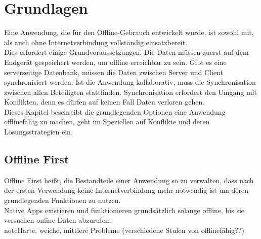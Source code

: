 \chapter{\label{chap:grundlagen}Grundlagen}
Eine Anwendung, die für den Offline-Gebrauch entwickelt wurde, ist sowohl mit, als auch ohne Internetverbindung vollständig einsatzbereit.\\
Dies erfordert einige Grundvoraussetzungen. Die Daten müssen zuerst auf dem Endgerät gespeichert werden, um offline erreichbar zu sein.
Gibt es eine serverseitige Datenbank, müssen die Daten zwischen Server und Client synchronisiert werden. Ist die Anwendung kollaborativ, muss die Synchronisation zwischen allen Beteiligten stattfinden. Synchronisation erfordert den Umgang mit Konflikten, denn es dürfen auf keinen Fall Daten verloren gehen.\\
Dieses Kapitel beschreibt die grundlegenden Optionen eine Anwendung offlinefähig zu machen, geht im Speziellen auf Konflikte und deren Lösungsstrategien ein. 
%
%
\section{Offline First}
Offline First heißt, die Bestandteile einer Anwendung so zu verwalten, dass nach der ersten Verwendung keine Internetverbindung mehr notwendig ist um deren grundlegenden Funktionen zu nutzen.\\
Native \Glspl{App} existieren und funktionieren grundsätzlich solange offline, bis sie versuchen online Daten abzurufen.\\
note{Harte, weiche, mittlere Probleme (verschiedene Stufen von offlinefähig??)}\\

